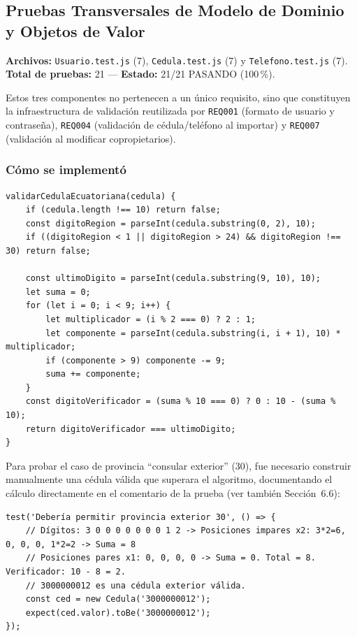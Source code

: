 \documentclass[12pt,a4paper]{article}
\begin{document}
\subsection{Pruebas Transversales de Modelo de Dominio y Objetos de Valor}
\textbf{Archivos:} \texttt{Usuario.test.js} (7), \texttt{Cedula.test.js} (7) y
\texttt{Telefono.test.js} (7).\\
\textbf{Total de pruebas:} 21 — \textbf{Estado:} 21/21 PASANDO (100\,\%).

Estos tres componentes no pertenecen a un único requisito, sino que constituyen la
infraestructura de validación reutilizada por \texttt{REQ001} (formato de usuario y
contraseña), \texttt{REQ004} (validación de cédula/teléfono al importar) y
\texttt{REQ007} (validación al modificar copropietarios).

\subsubsection*{Cómo se implementó}

\begin{lstlisting}[caption={Algoritmo Módulo 10 ecuatoriano (\texttt{src/core/domain/valueObjects/Cedula.js})}]
validarCedulaEcuatoriana(cedula) {
    if (cedula.length !== 10) return false;
    const digitoRegion = parseInt(cedula.substring(0, 2), 10);
    if ((digitoRegion < 1 || digitoRegion > 24) && digitoRegion !== 30) return false;

    const ultimoDigito = parseInt(cedula.substring(9, 10), 10);
    let suma = 0;
    for (let i = 0; i < 9; i++) {
        let multiplicador = (i % 2 === 0) ? 2 : 1;
        let componente = parseInt(cedula.substring(i, i + 1), 10) * multiplicador;
        if (componente > 9) componente -= 9;
        suma += componente;
    }
    const digitoVerificador = (suma % 10 === 0) ? 0 : 10 - (suma % 10);
    return digitoVerificador === ultimoDigito;
}
\end{lstlisting}

Para probar el caso de provincia ``consular exterior'' (30), fue necesario construir
manualmente una cédula válida que superara el algoritmo, documentando el cálculo
directamente en el comentario de la prueba (ver también Sección~6.6):

\begin{lstlisting}[caption={Cédula exterior válida calculada manualmente (\texttt{Cedula.test.js})}]
test('Debería permitir provincia exterior 30', () => {
    // Dígitos: 3 0 0 0 0 0 0 0 1 2 -> Posiciones impares x2: 3*2=6, 0, 0, 0, 1*2=2 -> Suma = 8
    // Posiciones pares x1: 0, 0, 0, 0 -> Suma = 0. Total = 8. Verificador: 10 - 8 = 2.
    // 3000000012 es una cédula exterior válida.
    const ced = new Cedula('3000000012');
    expect(ced.valor).toBe('3000000012');
});
\end{lstlisting}
\end{document}
